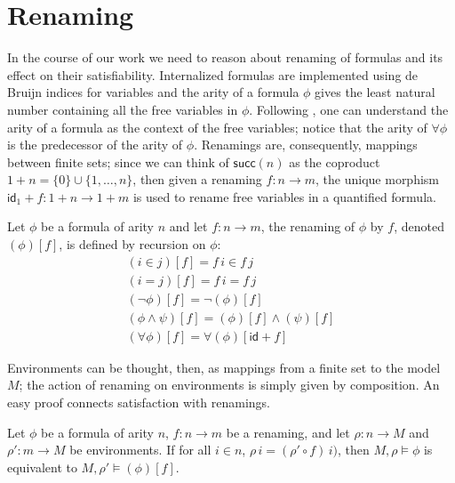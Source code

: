 \section{Renaming}
\label{sec:renaming}
\newcommand{\renaming}[2]{(#1)[#2]}
\newcommand{\inFm}[2]{#1 \in #2}
\newcommand{\eqFm}[2]{#1 = #2}
\newcommand{\negFm}[1]{\neg #1}
\newcommand{\andFm}[2]{#1 \wedge #2}
\newcommand{\forallFm}[1]{\forall #1}

\newcommand{\inIFm}[2]{\mathsf{Member}(#1,#2)}
\newcommand{\eqIFm}[2]{\mathsf{Equal}(#1,#2)}
\newcommand{\nandIFm}[2]{\mathsf{Nand}(#1,#2)}
\newcommand{\forallIFm}[1]{\mathsf{Forall(#1)}}


In the course of our work we need to reason about renaming of formulas
and its effect on their satisfiability. Internalized formulas are
implemented using de Bruijn indices for variables and the arity of a
formula $\phi$ gives the least natural number containing all the free
variables in $\phi$. Following \citet{fiore-abssyn}, one can
understand the arity of a formula as the context of the free
variables; notice that the arity of $\forallFm{\phi}$ is the
predecessor of the arity of $\phi$. Renamings are, consequently,
mappings between finite sets; since we can think of $\mathsf{succ}(n)$
as the coproduct $1+n = \{0\} \cup \{1,\dots,n\}$, then given a
renaming $f \colon n \to m$, the 
unique morphism $\mathsf{id}_1+f \colon 1+n \to 1+m$ is used to rename
free variables in a quantified formula.

\begin{definition}[Renaming]
  Let $\phi$ be a formula of arity $n$ and let $f \colon n \to m$, the
  renaming of $\phi$ by $f$, denoted $\renaming{\phi}{f}$, is defined
  by recursion on $\phi$:
  \begin{gather*}
    \renaming{\inFm{i}{j}}{f} = \inFm{f\,i}{f\,j}\\
    \renaming{\eqFm{i}{j}}{f} = \eqFm{f\,i}{f\,j}\\
    \renaming{\negFm{\phi}}{f} = \negFm{\renaming{\phi}{f}}\\
    \renaming{\andFm{\phi}{\psi}}{f} = \andFm{\renaming{\phi}{f}}{\renaming{\psi}{f}}\\
    \renaming{\forallFm{\phi}}{f} = \forallFm{\renaming{\phi}{\mathsf{id}+f}}
  \end{gather*}
\end{definition}

Environments can be thought, then, as mappings from a finite set to
the model $M$; the action of renaming on environments is simply given
by composition. An easy proof connects satisfaction with renamings.
\begin{lemma}
  \label{lem:renaming}
  Let $\phi$ be a formula of arity $n$, $f \colon n \to m$ be a
  renaming, and let $\rho \colon n \to M$ and $\rho' \colon m \to M$
  be environments. If for all $i \in n$,
  $\rho\,i = (\rho' \circ f)\,i)$, then $M,\rho\models \phi$ is
  equivalent to $M,\rho' \models \renaming{\phi}{f}$.
\end{lemma}

